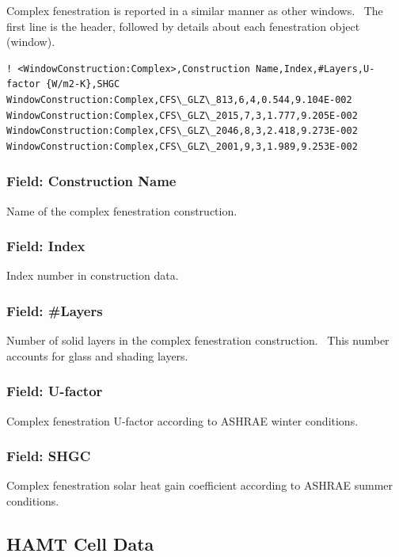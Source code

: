 Complex fenestration is reported in a similar manner as other windows.~ The first line is the header, followed by details about each fenestration object (window).

\begin{lstlisting}
! <WindowConstruction:Complex>,Construction Name,Index,#Layers,U-factor {W/m2-K},SHGC
WindowConstruction:Complex,CFS\_GLZ\_813,6,4,0.544,9.104E-002
WindowConstruction:Complex,CFS\_GLZ\_2015,7,3,1.777,9.205E-002
WindowConstruction:Complex,CFS\_GLZ\_2046,8,3,2.418,9.273E-002
WindowConstruction:Complex,CFS\_GLZ\_2001,9,3,1.989,9.253E-002
\end{lstlisting}

\subsubsection{Field: Construction Name}\label{field-construction-name-2}

Name of the complex fenestration construction.

\subsubsection{Field: Index}\label{field-index}

Index number in construction data.

\subsubsection{Field: \#Layers}\label{field-layers-2}

Number of solid layers in the complex fenestration construction.~ This number accounts for glass and shading layers.

\subsubsection{Field: U-factor}\label{field-u-factor}

Complex fenestration U-factor according to ASHRAE winter conditions.

\subsubsection{Field: SHGC}\label{field-shgc-1}

Complex fenestration solar heat gain coefficient according to ASHRAE summer conditions.

\subsection{HAMT Cell Data}\label{hamt-cell-data}

